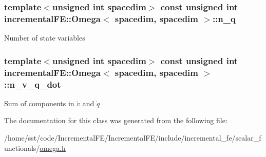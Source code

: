 \subsubsection[{\texorpdfstring{n\+\_\+q}{n_q}}]{\setlength{\rightskip}{0pt plus 5cm}template$<$unsigned int spacedim$>$ const unsigned int {\bf incremental\+F\+E\+::\+Omega}$<$ spacedim, spacedim $>$\+::n\+\_\+q}\hypertarget{classincremental_f_e_1_1_omega_3_01spacedim_00_01spacedim_01_4_a708fdb9951f4879eaa020219f19db115}{}\label{classincremental_f_e_1_1_omega_3_01spacedim_00_01spacedim_01_4_a708fdb9951f4879eaa020219f19db115}
Number of state variables 
\subsubsection[{\texorpdfstring{n\+\_\+v\+\_\+q\+\_\+dot}{n_v_q_dot}}]{\setlength{\rightskip}{0pt plus 5cm}template$<$unsigned int spacedim$>$ const unsigned int {\bf incremental\+F\+E\+::\+Omega}$<$ spacedim, spacedim $>$\+::n\+\_\+v\+\_\+q\+\_\+dot}\hypertarget{classincremental_f_e_1_1_omega_3_01spacedim_00_01spacedim_01_4_ae34ad644385b50d04d1b04e42c8a5b28}{}\label{classincremental_f_e_1_1_omega_3_01spacedim_00_01spacedim_01_4_ae34ad644385b50d04d1b04e42c8a5b28}
Sum of components in $\dot{v}$ and $\dot{q}$ 

The documentation for this class was generated from the following file\+:\begin{DoxyCompactItemize}
\item 
/home/sst/code/\+Incremental\+F\+E/\+Incremental\+F\+E/include/incremental\+\_\+fe/scalar\+\_\+functionals/\hyperlink{omega_8h}{omega.\+h}\end{DoxyCompactItemize}
